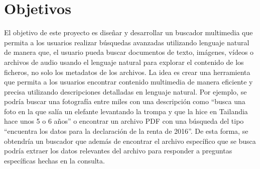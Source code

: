 
\chapter{Objetivos}
\label{objetivos}

El objetivo de este proyecto es diseñar y desarrollar un buscador multimedia que permita a los usuarios realizar búsquedas avanzadas utilizando lenguaje natural de manera que, el usuario pueda buscar documentos de texto, imágenes, vídeos o archivos de audio usando el lenguaje natural para explorar el contenido de los ficheros, no solo los metadatos de los archivos.
La idea es crear una herramienta que permita a los usuarios encontrar contenido multimedia de manera eficiente y precisa utilizando descripciones detalladas en lenguaje natural. Por ejemplo, se podría buscar una fotografía entre miles con una descripción como “busca una foto en la que salía un elefante levantando la trompa y que la hice en Tailandia hace unos 5 o 6 años” o encontrar un archivo PDF con una búsqueda del tipo “encuentra los datos para la declaración de la renta de 2016”.
De esta forma, se obtendría un buscador que además de encontrar el archivo específico que se busca podría extraer los datos relevantes del archivo para responder a preguntas específicas hechas en la consulta.